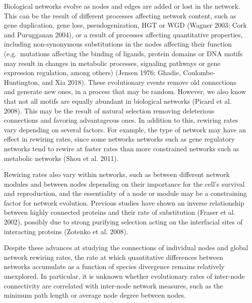 \documentclass[
]{article}
\begin{document}
Biological networks evolve as nodes and edges are added or lost in the network. This can be the result of different processes affecting network content, such as gene duplication, gene loss, pseudogenization, HGT or WGD (Wagner 2003; Cork and Purugganan 2004), or a result of processes affecting quantitative properties, including non-synonymous substitutions in the nodes affecting their function (e.g.~mutations affecting the binding of ligands, protein domains or DNA motifs may result in changes in metabolic processes, signaling pathways or gene expression regulation, among others) (Jensen 1976; Ghadie, Coulombe-Huntington, and Xia 2018). These evolutionary events remove old connections and generate new ones, in a process that may be random. However, we also know that not all motifs are equally abundant in biological networks (Picard et al. 2008). This may be the result of natural selection removing deleterious connections and favoring advantageous ones. In addition to this, rewiring rates vary depending on several factors. For example, the type of network may have an effect in rewiring rates, since some networks networks such as gene regulatory networks tend to rewire at faster rates than more constrained networks such as metabolic networks (Shou et al. 2011).

Rewiring rates also vary within networks, such as between different network modules and between nodes depending on their importance for the cell's survival and reproduction, and the essentiality of a node or module may be a constraining factor for network evolution. Previous studies have shown an inverse relationship between highly connected proteins and their rate of substitution (Fraser et al. 2002), possibly due to strong purifying selection acting on the interfacial sites of interacting proteins (Zotenko et al. 2008).

Despite these advances at studying the connections of individual nodes and global network rewiring rates, the rate at which quantitative differences between networks accumulate as a function of species divergence remains relatively unexplored. In particular, it is unknown whether evolutionary rates of inter-node connectivity are correlated with inter-node network measures, such as the minimum path length or average node degree between nodes.
\end{document}

